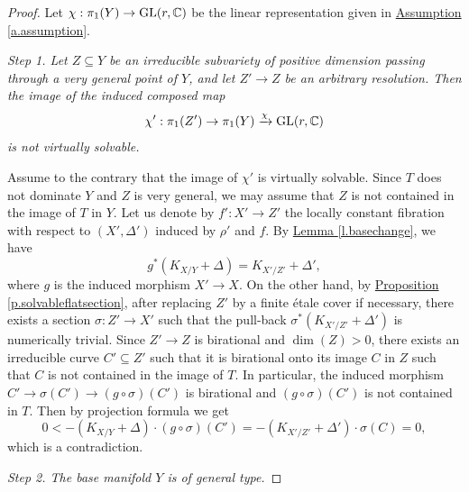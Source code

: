 \begin{proof}
	Let $\chi:\pi_1(Y) \rightarrow \operatorname{GL}(r,\mathbb C)$ be the linear representation given in  {\hyperref[a.assumption]{Assumption \ref*{a.assumption}}}.
	
	\bigskip
	
  \noindent
	\textit{Step 1. Let $Z\subseteq Y$ be an irreducible subvariety of positive dimension passing through a very general point of $Y$, and let $Z'\rightarrow Z$ be an arbitrary resolution. Then the image of the induced composed map 
		\[
		\chi':\pi_1(Z')\rightarrow \pi_1(Y)\xrightarrow{\chi} \textup{GL}(r,\mathbb C)
		\]
    is not virtually solvable.}

    \bigskip
     
    Assume to the contrary that the image of $\chi'$ is virtually solvable. 
    Since $T$ does not dominate $Y$ and $Z$ is very general, we may assume that $Z$ is not contained in the image of $T$ in $Y$. Let us denote by $f':X'\rightarrow Z'$ the locally constant fibration with respect to $(X',\Delta')$ induced by $\rho'$ and $f$. 
    By {\hyperref[l.basechange]{Lemma \ref*{l.basechange}}}, we have
    \[
    g^*(K_{X/Y}+\Delta) = K_{X'/Z'}+\Delta',
    \]
    where $g$ is the induced morphism $X'\rightarrow X$. On the other hand, by {\hyperref[p.solvableflatsection]{Proposition \ref*{p.solvableflatsection}}}, after replacing $Z'$ by a finite \'etale cover if necessary, there exists a section $\sigma:Z'\rightarrow X'$ such that the pull-back $\sigma^*(K_{X'/Z'}+\Delta')$ is numerically trivial. Since $Z'\rightarrow Z$ is birational and $\dim(Z)>0$, there exists an irreducible curve $C'\subseteq Z'$ such that it is birational onto its image $C$ in $Z$ such that $C$ is not contained in the image of $T$. In particular, the induced morphism $C'\rightarrow \sigma(C')\rightarrow (g\circ \sigma)(C')$ is birational and $(g\circ \sigma)(C')$ is not contained in $T$. Then by projection formula we get
    \[
    0<-(K_{X/Y}+\Delta)\cdot (g\circ \sigma)(C') = -(K_{X'/Z'}+\Delta')\cdot \sigma(C)=0,
    \]
    which is a contradiction.
    
    \bigskip
    
    \noindent
    \textit{Step 2. The base manifold $Y$ is of general type.}
    
    \bigskip
    

\end{proof}
